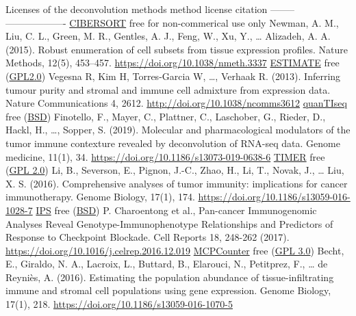 \documentclass[
  12pt,
]{book}
\theoremstyle{definition}
\theoremstyle{definition}
\theoremstyle{definition}
\theoremstyle{definition}
\theoremstyle{remark}
\begin{document}
Licenses of the deconvolution methods
\textbar{} method \textbar{} license \textbar{} citation \textbar{}
\textbar--------\textbar---------\textbar----------\textbar{}
\textbar{} \href{https://cibersort.stanford.edu/}{CIBERSORT} \textbar{} free for non-commerical use only \textbar{} Newman, A. M., Liu, C. L., Green, M. R., Gentles, A. J., Feng, W., Xu, Y., \ldots{} Alizadeh, A. A. (2015). Robust enumeration of cell subsets from tissue expression profiles. Nature Methods, 12(5), 453--457. \url{https://doi.org/10.1038/nmeth.3337} \textbar{}
\textbar{} \href{https://bioinformatics.mdanderson.org/public-software/estimate/}{ESTIMATE} \textbar{} free (\href{https://bioinformatics.mdanderson.org/estimate/}{GPL2.0}) \textbar{} Vegesna R, Kim H, Torres-Garcia W, \ldots, Verhaak R. (2013). Inferring tumour purity and stromal and immune cell admixture from expression data. Nature Communications 4, 2612. \url{http://doi.org/10.1038/ncomms3612} \textbar{}
\textbar{} \href{http://icbi.at/software/quantiseq/doc/index.html}{quanTIseq} \textbar{} free (\href{https://github.com/icbi-lab/immunedeconv/blob/master/LICENSE.md}{BSD}) \textbar{} Finotello, F., Mayer, C., Plattner, C., Laschober, G., Rieder, D., Hackl, H., \ldots, Sopper, S. (2019). Molecular and pharmacological modulators of the tumor immune contexture revealed by deconvolution of RNA-seq data. Genome medicine, 11(1), 34. \url{https://doi.org/10.1186/s13073-019-0638-6} \textbar{}
\textbar{} \href{http://cistrome.org/TIMER/}{TIMER} \textbar{} free (\href{http://cistrome.org/TIMER/download.html}{GPL 2.0}) \textbar{} Li, B., Severson, E., Pignon, J.-C., Zhao, H., Li, T., Novak, J., \ldots{} Liu, X. S. (2016). Comprehensive analyses of tumor immunity: implications for cancer immunotherapy. Genome Biology, 17(1), 174. \url{https://doi.org/10.1186/s13059-016-1028-7} \textbar{}
\textbar{} \href{https://github.com/icbi-lab/Immunophenogram}{IPS} \textbar{} free (\href{https://github.com/icbi-lab/Immunophenogram/blob/master/LICENSE}{BSD}) \textbar{} P. Charoentong et al., Pan-cancer Immunogenomic Analyses Reveal Genotype-Immunophenotype Relationships and Predictors of Response to Checkpoint Blockade. Cell Reports 18, 248-262 (2017). \url{https://doi.org/10.1016/j.celrep.2016.12.019} \textbar{}
\textbar{} \href{https://github.com/ebecht/MCPcounter}{MCPCounter} \textbar{} free (\href{https://github.com/ebecht/MCPcounter/blob/master/Source/License}{GPL 3.0}) \textbar{} Becht, E., Giraldo, N. A., Lacroix, L., Buttard, B., Elarouci, N., Petitprez, F., \ldots{} de Reyniès, A. (2016). Estimating the population abundance of tissue-infiltrating immune and stromal cell populations using gene expression. Genome Biology, 17(1), 218. \url{https://doi.org/10.1186/s13059-016-1070-5} \textbar{}
\end{document}
